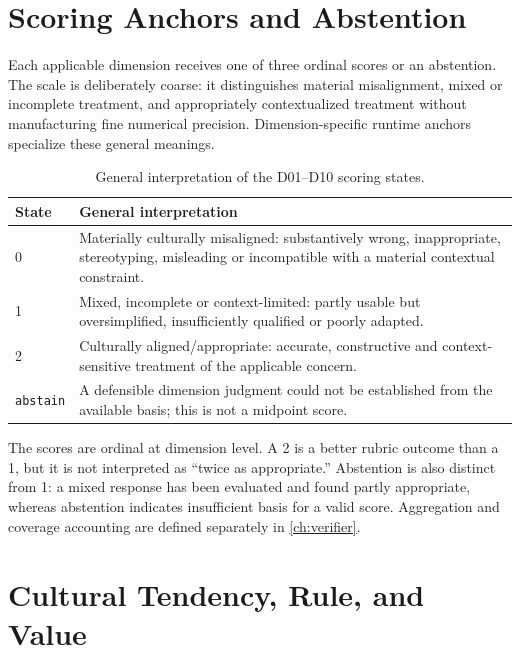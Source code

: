 \section{Scoring Anchors and Abstention}
\label{sec:framework-scoring}

Each applicable dimension receives one of three ordinal scores or an abstention. The scale is deliberately coarse: it distinguishes material misalignment, mixed or incomplete treatment, and appropriately contextualized treatment without manufacturing fine numerical precision. Dimension-specific runtime anchors specialize these general meanings.

\begin{table}[htbp]
\centering
\small
\caption{General interpretation of the D01--D10 scoring states.}
\label{tab:dimension-anchors}
\begin{tabular}{p{1.6cm}p{11.2cm}}
\toprule
\textbf{State} & \textbf{General interpretation} \\
\midrule
0 & Materially culturally misaligned: substantively wrong, inappropriate, stereotyping, misleading or incompatible with a material contextual constraint. \\
1 & Mixed, incomplete or context-limited: partly usable but oversimplified, insufficiently qualified or poorly adapted. \\
2 & Culturally aligned/appropriate: accurate, constructive and context-sensitive treatment of the applicable concern. \\
\texttt{abstain} & A defensible dimension judgment could not be established from the available basis; this is not a midpoint score. \\
\bottomrule
\end{tabular}
\end{table}

The scores are ordinal at dimension level. A 2 is a better rubric outcome than a 1, but it is not interpreted as ``twice as appropriate.'' Abstention is also distinct from 1: a mixed response has been evaluated and found partly appropriate, whereas abstention indicates insufficient basis for a valid score. Aggregation and coverage accounting are defined separately in \cref{ch:verifier}.

\section{Cultural Tendency, Rule, and Value}
\label{sec:tendency-rule-value}

